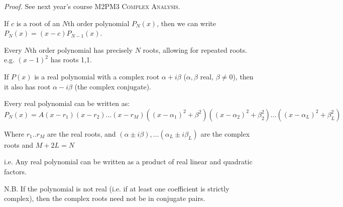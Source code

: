 \documentclass[10pt]{scrartcl}
\begin{document}
\textit{Proof.} See next year's course \textsc{M2PM3 Complex Analysis.}\\


\begin{corollary}
If $c$ is a root of an $N$th order polynomial $P_N(x)$, then we can write $P_N(x) = (x-c)P_{N-1}(x)$.
\end{corollary}\vspace*{5pt}

\begin{corollary}
Every $N$th order polynomial has precisely $N$ roots, allowing for repeated roots. e.g. $(x-1)^2$ has roots 1,1.
\end{corollary}\vspace*{5pt}

\begin{corollary}
If $P(x)$ is a real polynomial with a complex root $\alpha + i\beta$ ($\alpha, \beta$ real, $\beta \neq 0$), then it also has root $\alpha - i\beta$ (the complex conjugate).
\end{corollary}\vspace*{5pt}

\begin{corollary}
Every real polynomial can be written as:\\ $P_N(x) = A(x-r_1)(x-r_2)...(x-r_M)((x-\alpha _1)^2 + \beta ^2)((x-\alpha _2)^2 + \beta _2^2)...((x - \alpha _ L)^2 + \beta _L^2)$

Where $r_1.. r_M$ are the real roots, and $(\alpha \pm i \beta),... (\alpha _L \pm i\beta _L)$ are the complex roots and $M + 2L = N$
\end{corollary}

i.e. Any real polynomial can be written as a product of real linear and quadratic factors.

N.B. If the polynomial is not real (i.e. if at least one coefficient is strictly complex), then the complex roots need not be in conjugate pairs.\\
\end{document}
